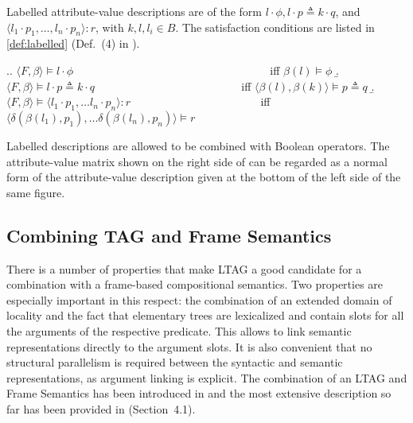 Labelled attribute-value descriptions are of the form $l \cdot \phi, l \cdot p \triangleq k \cdot q$, and $\langle l_1 \cdot p_1, \ldots , l_n \cdot p_n \rangle : r$, with $k, l, l_i \in B$. The satisfaction conditions are listed in \ref{def:labelled} (Def.~(4) in \citealt{KallmeyerOsswald:13}).

\ex.\label{def:labelled}\a. $\langle F, \beta \rangle \models l \cdot \phi$ ~~~~~~~~~~~~~~~~~~~~~~~~~~~~~~~~~~ iff $\beta (l) \models \phi $
\b.$\langle F, \beta \rangle \models l \cdot p \triangleq k \cdot q $ ~~~~~~~~~~~~~~~~~~~~~~~~~ iff $\langle \beta (l), \beta (k) \rangle \models p \triangleq q$
\b.$\langle F, \beta \rangle \models \langle l_1 \cdot p_1, \ldots l_n \cdot p_n \rangle : r$ ~~~~~~~~~~~~~~~~~~~~~~ iff $\langle \delta (\beta (l_1), p_1), \ldots \delta (\beta (l_n), p_n) \rangle \models r $

Labelled descriptions are allowed to be combined with Boolean operators. The attribute-value matrix shown on the right side of  can be regarded as a normal form of the attribute-value description given at the bottom of the left side of the same figure. 

\subsection{Combining TAG and Frame Semantics}
There is a number of properties that make LTAG a good candidate for a combination with a frame-based compositional semantics. Two properties are especially important in this respect: the combination of an extended domain of locality and the fact that elementary trees are lexicalized and contain slots for all the arguments of the respective predicate. This allows to link semantic representations directly to the argument slots. It is also convenient that no structural parallelism is required between the syntactic and semantic representations, as argument linking is explicit. The combination of an LTAG and Frame Semantics has been introduced in \cite{KallmeyerOsswald:12} and the most extensive description so far has been provided in \citealt{KallmeyerOsswald:13} (Section~4.1).

